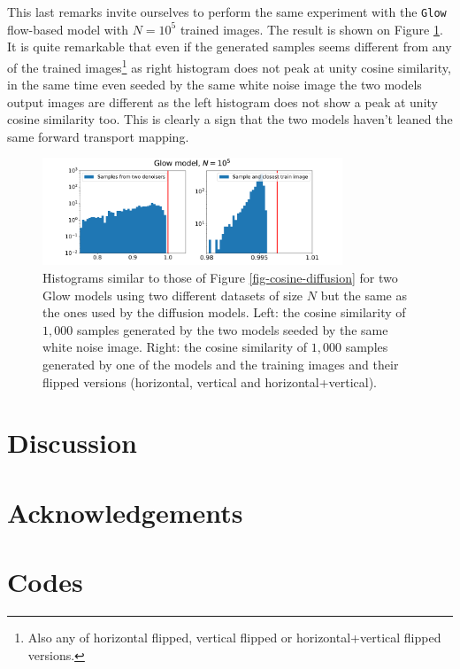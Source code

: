 \documentclass[11pt]{amsart}
\begin{document}
This last remarks invite ourselves to perform the same experiment with the \texttt{Glow} flow-based model with $N=10^5$ trained images. The result is shown on Figure \ref{fig-cosine-glow}. It is quite remarkable that even if the generated samples seems different from any of the trained images\footnote{Also any of horizontal flipped, vertical flipped or horizontal+vertical flipped versions.} as right histogram does not peak at unity cosine similarity, in the same time even seeded by the same white noise image the two models output images are different as the left histogram does not show a peak at unity cosine similarity too. This is clearly a sign that the two models haven't leaned the same forward transport mapping. 
%
\begin{figure}
    \centering
	\includegraphics[width=0.8\textwidth]{fig-glow-cosine-AB_ATrain.pdf}
	\caption{Histograms similar to those of Figure \ref{fig-cosine-diffusion} for two Glow models using two different datasets of size $N$ but the same as the ones used by the diffusion models. Left: the cosine similarity of $1,000$ samples generated by the two models seeded by the same white noise image. Right: the cosine similarity of $1,000$ samples generated by one of the models and the training images and their flipped versions (horizontal, vertical and horizontal+vertical).}
	\label{fig-cosine-glow} 
\end{figure}




\section{Discussion}


\section*{Acknowledgements}

\section*{Codes}


\end{document}
